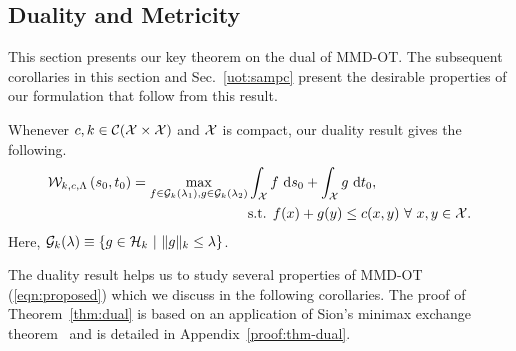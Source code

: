 \subsection{Duality and Metricity}
This section presents our key theorem on the dual of MMD-OT. The subsequent corollaries in this section and Sec.~\ref{uot:sampc} present the desirable properties of our formulation that follow from this result.
\begin{theoremBox}
\begin{theorem}\label{thm:dual}
 Whenever $c, k\in\mathcal{C}(\mathcal{X}\times\mathcal{X})$ and $\mathcal{X}$ is compact, our duality result gives the following.
 \begin{align}\label{uot-eqn:dual}
\mathcal{W}_{k, c, \Lambda}\left(s_0,t_0\right)=\max\limits_{f\in\mathcal{G}_k(\lambda_1),g\in\mathcal{G}_k(\lambda_2)}&\int_{\mathcal{X}} f\ \textup{d}s_0+\int_{\mathcal{X}} g\ \textup{d}t_0, \nonumber\\
    &\textup{s.t. }f(x)+g(y)\le c(x,y)\ \forall\ x,y\in\mathcal{X}.
 \end{align}
Here, $\calG_k(\lambda)\equiv\{g\in \calH_k\ |\ \|g\|_k\le\lambda\}$.
\end{theorem}
\end{theoremBox}

The duality result helps us to study several properties of MMD-OT (\ref{eqn:proposed}) which we discuss in the following corollaries. The proof of Theorem~\ref{thm:dual} is based on an application of Sion's minimax exchange theorem~\citep{Sion} and is detailed in Appendix~\ref{proof:thm-dual}.

